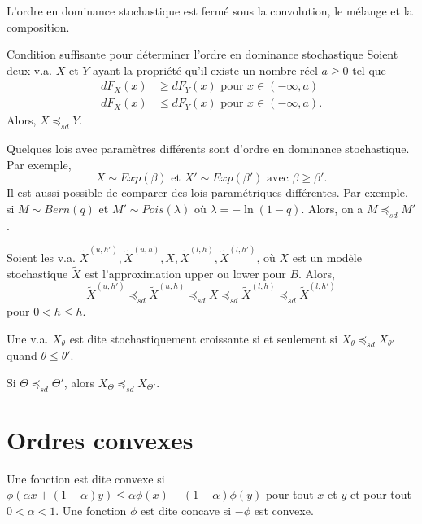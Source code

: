 L'ordre en dominance stochastique est fermé sous la convolution, le mélange et la composition.

\begin{proposition}{Condition suffisante pour déterminer l'ordre en dominance stochastique}{}
	Soient deux v.a. $X$ et $Y$ ayant la propriété qu'il existe un nombre réel $a\geq 0$ tel que 
	\begin{align*}
	dF_X(x) &\geq dF_Y(x) \text{ pour } x\in(-\infty, a)\\
	dF_X(x) &\leq dF_Y(x) \text{ pour } x\in(-\infty, a).
	\end{align*}
	Alors, $X\preceq_{sd} Y$. 
\end{proposition}

Quelques lois avec paramètres différents sont d'ordre en dominance stochastique. Par exemple, 
$$X \sim Exp(\beta) \text{ et } X' \sim Exp(\beta') \text{ avec } \beta \geq \beta'.$$
Il est aussi possible de comparer des lois paramétriques différentes. Par exemple, si $M \sim Bern(q)$ et $M' \sim Pois(\lambda)$ où $\lambda = -\ln (1 - q)$. Alors, on a $M \preceq_{sd} M'$.

\begin{proposition}{}{}
	Soient les v.a. $\widetilde{X}^{(u, h')}, \widetilde{X}^{(u, h)}, X, \widetilde{X}^{(l, h)}, \widetilde{X}^{(l, h')}$, où $X$ est un modèle stochastique $\widetilde{X}$ est l'approximation upper ou lower pour $B$. Alors, 
	$$\widetilde{X}^{(u, h')} \preceq_{sd}\widetilde{X}^{(u, h)}\preceq_{sd} X\preceq_{sd} \widetilde{X}^{(l, h)}\preceq_{sd} \widetilde{X}^{(l, h')}$$
	pour $0<h\leq h$. 
\end{proposition}

\begin{definition}{}{}
	Une v.a. $X_\theta$ est dite stochastiquement croissante si et seulement si $X_\theta \preceq_{sd} X_{\theta'}$ quand $\theta\leq \theta'$. 
\end{definition}

\begin{proposition}{}{}
	Si $\Theta \preceq_{sd} \Theta'$, alors $X_\Theta \preceq_{sd} X_{\Theta'}$. 
\end{proposition}

\section{Ordres convexes}

\begin{definition}{}{}
	Une fonction est dite convexe si $\phi(\alpha x + (1-\alpha)y) \leq \alpha \phi(x) + (1-\alpha) \phi(y)$ pour tout $x$ et $y$ et pour tout $0<\alpha<1$. 
	\tcblower
	Une fonction $\phi$ est dite concave si $-\phi$ est convexe. 
\end{definition}


